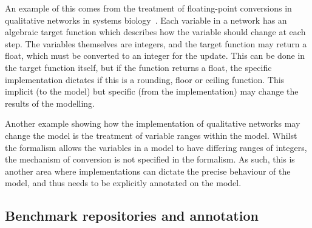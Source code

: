 \documentclass[conference]{IEEEtran}
\begin{document}
An example of this comes from the treatment of floating-point
conversions in qualitative networks in systems
biology~\cite{Schaub2007}. Each variable in a network has an algebraic
target function which describes how the variable should change at each
step. The variables themselves are integers, and the target function
may return a float, which must be converted to an integer for the
update. This can be done in the target function itself, but if the
function returns a float, the specific implementation dictates if this
is a rounding, floor or ceiling function. This implicit (to the model)
but specific (from the implementation) may change the results of the
modelling.

Another example showing how the implementation of qualitative networks
may change the model is the treatment of variable ranges within the
model.  Whilst the formalism allows the variables in a model to have
differing ranges of integers, the mechanism of conversion is not
specified in the formalism. As such, this is another area where
implementations can dictate the precise behaviour of the model, and
thus needs to be explicitly annotated on the model.



\subsection{Benchmark repositories and annotation}

\end{document}
